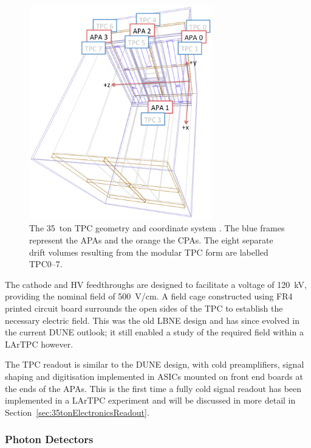 \begin{figure}
  \centering
  \includegraphics[width=8cm]{35tonGeometry.png}
  \caption[The 35~ton TPC geometry.]{The 35~ton TPC geometry and coordinate system \cite{35tonGeometryAlion2014}.  The blue frames represent the APAs and the orange the CPAs.  The eight separate drift volumes resulting from the modular TPC form are labelled TPC0--7.}
  \label{fig:35tonGeometry}
\end{figure}

The cathode and HV feedthroughs are designed to facilitate a voltage of 120~kV, providing the nominal field of 500~V/cm.  A field cage constructed using FR4 printed circuit board surrounds the open sides of the TPC to establish the necessary electric field.  This was the old LBNE design and has since evolved in the current DUNE outlook; it still enabled a study of the required field within a LArTPC however.

The TPC readout is similar to the DUNE design, with cold preamplifiers, signal shaping and digitisation implemented in ASICs mounted on front end boards at the ends of the APAs.  This is the first time a fully cold signal readout has been implemented in a LArTPC experiment and will be discussed in more detail in Section~\ref{sec:35tonElectronicsReadout}.

\subsubsection{Photon Detectors}\label{sec:35tonPhotonDetectors}

